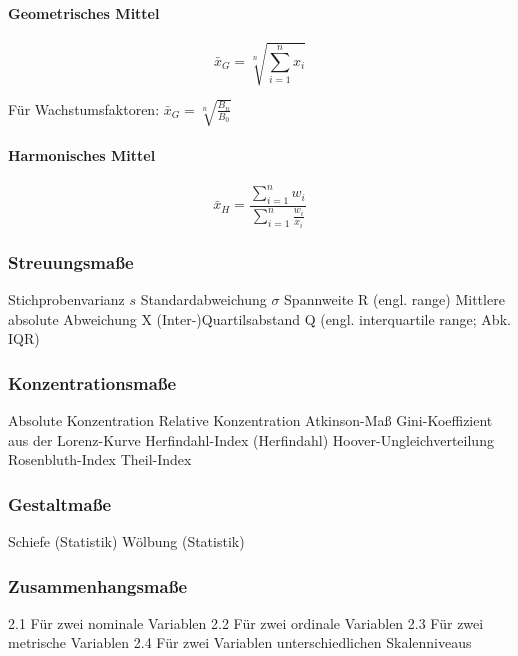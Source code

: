 \documentclass[10pt]{article}
\begin{document}
\begin{multicols}{2}
\paragraph{Geometrisches Mittel}

$$\bar{x}_G=\sqrt[n]{\sum\limits_{i=1}^n x_i} $$

\noindent Für Wachstumsfaktoren: $\bar{x}_G=\sqrt[n]{\frac{B_n}{B_0}}$

\paragraph{Harmonisches Mittel}

$$\bar{x}_H=\frac{\sum\limits_{i=1}^n w_i}{\sum\limits_{i=1}^n \frac{w_i}{x_i}}$$

\end{multicols}
\subsubsection{Streuungsmaße}



    Stichprobenvarianz $s$
    Standardabweichung $\sigma$
    Spannweite R (engl. range)
    Mittlere absolute Abweichung X
    (Inter-)Quartilsabstand Q (engl. interquartile range; Abk. IQR)

\subsubsection{Konzentrationsmaße}


    Absolute Konzentration
    Relative Konzentration
    Atkinson-Maß
    Gini-Koeffizient aus der Lorenz-Kurve
    Herfindahl-Index (Herfindahl)
    Hoover-Ungleichverteilung
    Rosenbluth-Index
    Theil-Index


\subsubsection{Gestaltmaße}


    Schiefe (Statistik)
    Wölbung (Statistik)


\subsubsection{Zusammenhangsmaße}


    2.1 Für zwei nominale Variablen
    2.2 Für zwei ordinale Variablen
    2.3 Für zwei metrische Variablen
    2.4 Für zwei Variablen unterschiedlichen Skalenniveaus
\end{document}

